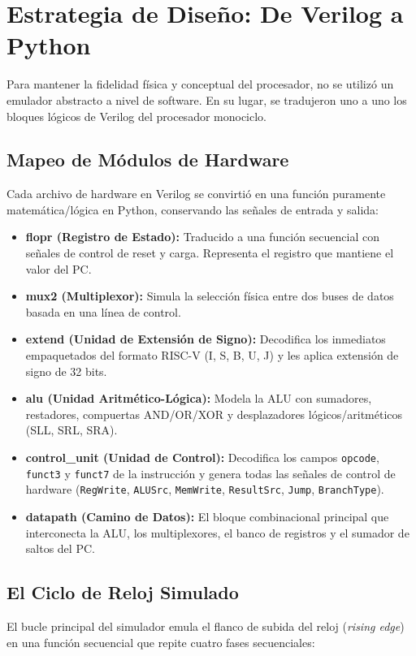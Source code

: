 \documentclass[12pt,letterpaper]{article}
\begin{document}
\section{Estrategia de Diseño: De Verilog a Python}
Para mantener la fidelidad física y conceptual del procesador, no se utilizó un emulador abstracto a nivel de software. En su lugar, se tradujeron uno a uno los bloques lógicos de Verilog del procesador monociclo. 

\subsection{Mapeo de Módulos de Hardware}
Cada archivo de hardware en Verilog se convirtió en una función puramente matemática/lógica en Python, conservando las señales de entrada y salida:

\begin{itemize}
    \item \textbf{flopr (Registro de Estado):} Traducido a una función secuencial con señales de control de reset y carga. Representa el registro que mantiene el valor del PC.
    \item \textbf{mux2 (Multiplexor):} Simula la selección física entre dos buses de datos basada en una línea de control.
    \item \textbf{extend (Unidad de Extensión de Signo):} Decodifica los inmediatos empaquetados del formato RISC-V (I, S, B, U, J) y les aplica extensión de signo de 32 bits.
    \item \textbf{alu (Unidad Aritmético-Lógica):} Modela la ALU con sumadores, restadores, compuertas AND/OR/XOR y desplazadores lógicos/aritméticos (SLL, SRL, SRA).
    \item \textbf{control\_unit (Unidad de Control):} Decodifica los campos \texttt{opcode}, \texttt{funct3} y \texttt{funct7} de la instrucción y genera todas las señales de control de hardware (\texttt{RegWrite}, \texttt{ALUSrc}, \texttt{MemWrite}, \texttt{ResultSrc}, \texttt{Jump}, \texttt{BranchType}).
    \item \textbf{datapath (Camino de Datos):} El bloque combinacional principal que interconecta la ALU, los multiplexores, el banco de registros y el sumador de saltos del PC.
\end{itemize}

\subsection{El Ciclo de Reloj Simulado}
El bucle principal del simulador emula el flanco de subida del reloj (\textit{rising edge}) en una función secuencial que repite cuatro fases secuenciales:
\end{document}
